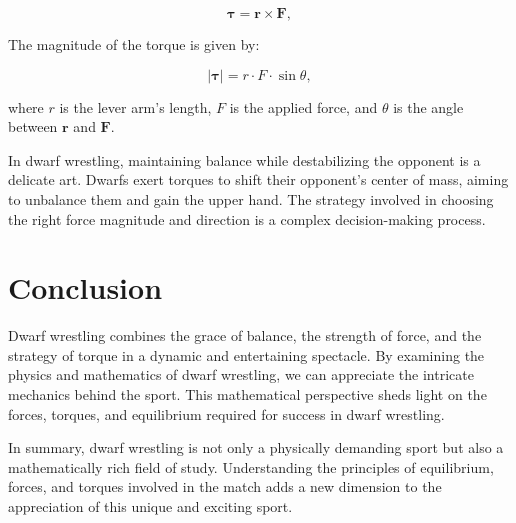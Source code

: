 \documentclass{article}
\begin{document}
\begin{equation}
\boldsymbol{\tau} = \mathbf{r} \times \mathbf{F},
\end{equation}

The magnitude of the torque is given by:

\begin{equation}
|\boldsymbol{\tau}| = r \cdot F \cdot \sin\theta,
\end{equation}

where $r$ is the lever arm's length, $F$ is the applied force, and $\theta$ is the angle between $\mathbf{r}$ and $\mathbf{F}$.

In dwarf wrestling, maintaining balance while destabilizing the opponent is a delicate art. Dwarfs exert torques to shift their opponent's center of mass, aiming to unbalance them and gain the upper hand. The strategy involved in choosing the right force magnitude and direction is a complex decision-making process.

\section{Conclusion}

Dwarf wrestling combines the grace of balance, the strength of force, and the strategy of torque in a dynamic and entertaining spectacle. By examining the physics and mathematics of dwarf wrestling, we can appreciate the intricate mechanics behind the sport. This mathematical perspective sheds light on the forces, torques, and equilibrium required for success in dwarf wrestling.

In summary, dwarf wrestling is not only a physically demanding sport but also a mathematically rich field of study. Understanding the principles of equilibrium, forces, and torques involved in the match adds a new dimension to the appreciation of this unique and exciting sport.
\end{document}
